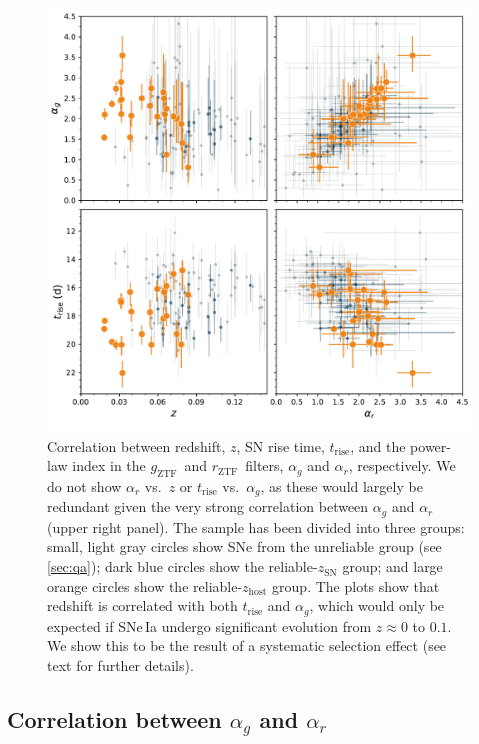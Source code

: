 \documentclass[twocolumn]{./aastex63}
\newcommand{\rztf}{$r_\mathrm{ZTF}$}
\newcommand{\gztf}{$g_\mathrm{ZTF}$}
\begin{document}
\begin{figure}
    \centering
    \includegraphics[width=6in]{./figures/param_correlations.pdf}
    \caption{Correlation between redshift, $z$, SN rise time,
    $t_\mathrm{rise}$, and the power-law index in the \gztf\ and \rztf\
    filters, $\alpha_g$ and $\alpha_r$, respectively. We do not show
    $\alpha_r$ vs.~$z$ or $t_\mathrm{rise}$ vs.~$\alpha_g$, as these would
    largely be redundant given the very strong correlation between $\alpha_g$
    and $\alpha_r$ (upper right panel). The sample has been divided into three
    groups: small, light gray circles show SNe from the unreliable group (see
    \ref{sec:qa}); dark blue circles show the reliable-$z_\mathrm{SN}$ group;
    and large orange circles show the reliable-$z_\mathrm{host}$ group. The
    plots show that redshift is correlated with both $t_\mathrm{rise}$ and
    $\alpha_g$, which would only be expected if SNe\,Ia undergo significant
    evolution from $z \approx 0$ to $0.1$. We show this to be the result
    of a systematic selection effect (see text for further details). }
    \label{fig:model_parameters}
\end{figure}

\subsection{Correlation between $\alpha_g$ and $\alpha_r$}\label{sec:alpha_correlation}
\end{document}
